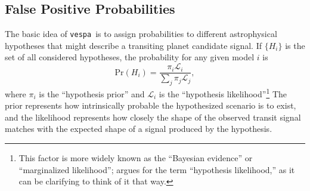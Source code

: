 \documentclass{emulateapj}
\newcommand{\eqlabel}[1]{\label{eq:#1}}
\newcommand{\sectlabel}[1]{\label{sect:#1}}
\newcommand{\vespa}{\texttt{vespa}}
\begin{document}

\subsection{False Positive Probabilities}
\sectlabel{methods:fpp}

The basic idea of \vespa\ is to assign probabilities to different
astrophysical hypotheses that might describe a transiting planet
candidate signal.  If $\{H_i\}$ is the set of all considered
hypotheses, the probability for any given model $i$ is
\begin{equation}
  \eqlabel{prob}
  \mathrm{Pr}\left(H_i\right) = \frac{\pi_i \mathcal
    L_i}{\displaystyle \sum_j \pi_j \mathcal L_j},
\end{equation}
where $\pi_i$ is the ``hypothesis prior'' and $\mathcal L_i$ is the
``hypothesis likelihood''\footnote{This factor is more widely known as
  the ``Bayesian evidence'' or ``marginalized likelihood'';
  \citet{Morton:2014b} argues for the term ``hypothesis likelihood,''
  as it can be clarifying to think of it that way.}
The prior represents how intrinsically probable the hypothesized
scenario is to exist, and the likelihood represents how closely the
shape of the observed transit signal matches with the expected shape
of a signal produced by the hypothesis.
\end{document}
